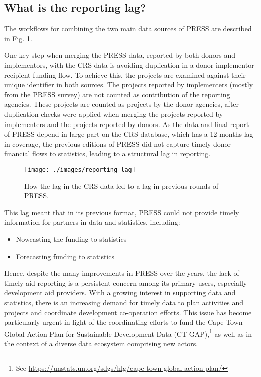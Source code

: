 \documentclass[
]{article}
\begin{document}
\hypertarget{what-is-the-reporting-lag}{%
\subsection{What is the reporting lag?}\label{what-is-the-reporting-lag}}

The workflows for combining the two main data sources of PRESS are described in Fig. \ref{fig:reporting-lag}.

One key step when merging the PRESS data, reported by both donors and implementors, with the CRS
data is avoiding duplication in a donor‐implementor‐recipient funding flow. To achieve this, the
projects are examined against their unique identifier in both sources. The projects reported by
implementers (mostly from the PRESS survey) are not counted as contribution of the reporting
agencies. These projects are counted as projects by the donor agencies, after duplication checks were
applied when merging the projects reported by implementers and the projects reported by donors.
As the data and final report of PRESS depend in large part on the CRS database, which has a 12‐months
lag in coverage, the previous editions of PRESS did not capture timely donor financial flows to
statistics, leading to a structural lag in reporting.

\begin{figure}

{\centering \texttt{[image: ./images/reporting\_lag]} 

}

\caption{How the lag in the CRS data led to a lag in previous rounds of PRESS.}\label{fig:reporting-lag}
\end{figure}

This lag meant that in its previous format, PRESS could not provide timely information for partners in
data and statistics, including:

\begin{itemize}
\item
  Nowcasting the funding to statistics
\item
  Forecasting funding to statistics
\end{itemize}

Hence, despite the many improvements in PRESS over the years, the lack of timely aid reporting is a
persistent concern among its primary users, especially development aid providers. With a growing
interest in supporting data and statistics, there is an increasing demand for timely data to plan
activities and projects and coordinate development co‐operation efforts. This issue has become
particularly urgent in light of the coordinating efforts to fund the Cape Town Global Action Plan for
Sustainable Development Data (CT‐GAP),\footnote{See \url{https://unstats.un.org/sdgs/hlg/cape-town-global-action-plan/}} as well as in the context of a diverse data ecosystem comprising new actors.
\end{document}
